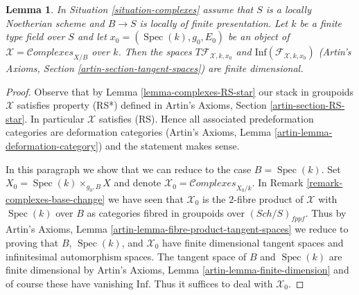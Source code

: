 \documentclass{stacks-project}
\theoremstyle{plain}
\newtheorem{lemma}[subsection]{Lemma}
\theoremstyle{definition}
\theoremstyle{remark}
\numberwithin{equation}{subsection}
\def\Spec{\mathop{\mathrm{Spec}}}
\def\Sch{\mathit{Sch}}
\def\Complexesstack{\mathcal{C}\!\mathit{omplexes}}
\begin{document}
\begin{lemma}
\label{lemma-complexes-tangent-space}
In Situation \ref{situation-complexes} assume that $S$ is a locally Noetherian
scheme and $B \to S$ is locally of finite presentation.
Let $k$ be a finite type field over $S$ and let
$x_0 = (\Spec(k), g_0, E_0)$
be an object of $\mathcal{X} = \Complexesstack_{X/B}$ over $k$.
Then the spaces $T\mathcal{F}_{\mathcal{X}, k, x_0}$ and
$\text{Inf}(\mathcal{F}_{\mathcal{X}, k, x_0})$
(Artin's Axioms, Section \ref{artin-section-tangent-spaces})
are finite dimensional.
\end{lemma}

\begin{proof}
Observe that by Lemma \ref{lemma-complexes-RS-star}
our stack in groupoids $\mathcal{X}$ satisfies property (RS*)
defined in Artin's Axioms, Section \ref{artin-section-RS-star}.
In particular $\mathcal{X}$ satisfies (RS).
Hence all associated predeformation
categories are deformation categories
(Artin's Axioms, Lemma \ref{artin-lemma-deformation-category})
and the statement makes sense.

\medskip\noindent
In this paragraph we show that we can reduce to the case $B = \Spec(k)$.
Set $X_0 = \Spec(k) \times_{g_0, B} X$
and denote $\mathcal{X}_0 = \Complexesstack_{X_0/k}$. In
Remark \ref{remark-complexes-base-change} we have seen that
$\mathcal{X}_0$ is the $2$-fibre product of $\mathcal{X}$ with
$\Spec(k)$ over $B$ as categories fibred in groupoids over
$(\Sch/S)_{fppf}$. Thus by
Artin's Axioms, Lemma \ref{artin-lemma-fibre-product-tangent-spaces}
we reduce to proving that $B$, $\Spec(k)$, and $\mathcal{X}_0$
have finite dimensional tangent spaces and infinitesimal automorphism
spaces. The tangent space of $B$ and $\Spec(k)$ are finite dimensional by
Artin's Axioms, Lemma \ref{artin-lemma-finite-dimension}
and of course these have vanishing $\text{Inf}$.
Thus it suffices to deal with $\mathcal{X}_0$.


\end{proof}
\end{document}
